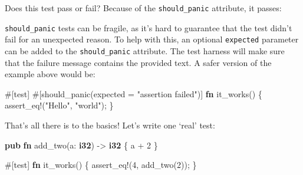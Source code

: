 \documentclass[a4paper,]{book}
\newenvironment{Shaded}{\begin{snugshade}}{\end{snugshade}}
\newcommand{\KeywordTok}[1]{\textcolor[rgb]{0.13,0.29,0.53}{\textbf{{#1}}}}
\newcommand{\DecValTok}[1]{\textcolor[rgb]{0.00,0.00,0.81}{{#1}}}
\newcommand{\StringTok}[1]{\textcolor[rgb]{0.31,0.60,0.02}{{#1}}}
\newcommand{\OtherTok}[1]{\textcolor[rgb]{0.56,0.35,0.01}{{#1}}}
\newcommand{\NormalTok}[1]{{#1}}
\begin{document}
Does this test pass or fail? Because of the \texttt{should\_panic}
attribute, it passes:

\begin{Shaded}
\end{Shaded}

\texttt{should\_panic} tests can be fragile, as it's hard to guarantee
that the test didn't fail for an unexpected reason. To help with this,
an optional \texttt{expected} parameter can be added to the
\texttt{should\_panic} attribute. The test harness will make sure that
the failure message contains the provided text. A safer version of the
example above would be:

\begin{Shaded}
\begin{Highlighting}[]
\OtherTok{#[}\NormalTok{test}\OtherTok{]}
\OtherTok{#[}\NormalTok{should_panic}\OtherTok{(}\NormalTok{expected }\OtherTok{=} \StringTok{"assertion failed"}\OtherTok{)]}
\KeywordTok{fn} \NormalTok{it_works() \{}
    \OtherTok{assert_eq!}\NormalTok{(}\StringTok{"Hello"}\NormalTok{, }\StringTok{"world"}\NormalTok{);}
\NormalTok{\}}
\end{Highlighting}
\end{Shaded}

That's all there is to the basics! Let's write one `real' test:

\begin{Shaded}
\begin{Highlighting}[]
\KeywordTok{pub} \KeywordTok{fn} \NormalTok{add_two(a: }\KeywordTok{i32}\NormalTok{) -> }\KeywordTok{i32} \NormalTok{\{}
    \NormalTok{a + }\DecValTok{2}
\NormalTok{\}}

\OtherTok{#[}\NormalTok{test}\OtherTok{]}
\KeywordTok{fn} \NormalTok{it_works() \{}
    \OtherTok{assert_eq!}\NormalTok{(}\DecValTok{4}\NormalTok{, add_two(}\DecValTok{2}\NormalTok{));}
\NormalTok{\}}
\end{Highlighting}
\end{Shaded}
\end{document}
